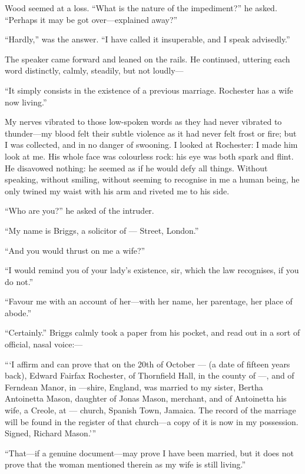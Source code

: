 \Mr{} Wood seemed at a loss. \enquote{What is the nature of the
	impediment?} he asked. \enquote{Perhaps it may be got over---explained
	away?}

\enquote{Hardly,} was the answer. \enquote{I have called it
	insuperable, and I speak advisedly.}

The speaker came forward and leaned on the rails. He continued,
uttering each word distinctly, calmly, steadily, but not loudly---

\enquote{It simply consists in the existence of a previous marriage.
	\Mr{} Rochester has a wife now living.}

My nerves vibrated to those low-spoken words as they had never vibrated
to thunder---my blood felt their subtle violence as it had never felt
frost or fire; but I was collected, and in no danger of swooning. I
looked at \Mr{} Rochester: I made him look at me. His whole face was
colourless rock: his eye was both spark and flint. He disavowed
nothing: he seemed as if he would defy all things. Without speaking,
without smiling, without seeming to recognise in me a human being, he
only twined my waist with his arm and riveted me to his side.

\enquote{Who are you?} he asked of the intruder.

\enquote{My name is Briggs, a solicitor of --- Street, London.}

\enquote{And you would thrust on me a wife?}

\enquote{I would remind you of your lady's existence, sir, which the law
	recognises, if you do not.}

\enquote{Favour me with an account of her---with her name, her
	parentage, her place of abode.}

\enquote{Certainly.} \Mr{} Briggs calmly took a paper from his pocket,
and read out in a sort of official, nasal voice:---

\enquote{\enquote{I affirm and can prove that on the 20th of October
		\AD{} --- (a date of fifteen years back), Edward Fairfax Rochester, of
		Thornfield Hall, in the county of ---, and of Ferndean Manor, in
		---shire, England, was married to my sister, Bertha Antoinetta Mason,
		daughter of Jonas Mason, merchant, and of Antoinetta his wife, a Creole,
		at --- church, Spanish Town, Jamaica. The record of the marriage will
		be found in the register of that church---a copy of it is now in my
		possession. Signed, Richard Mason.}}

\enquote{That---if a genuine document---may prove I have been married,
	but it does not prove that the woman mentioned therein as my wife is
	still living.}


